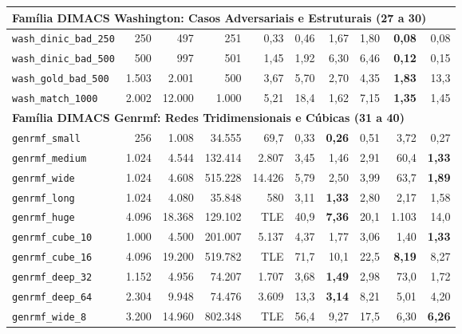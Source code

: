\begin{longtable}{lrrrrrrrrr}
\midrule
\multicolumn{10}{l}{\textbf{Família DIMACS Washington: Casos Adversariais e Estruturais (27 a 30)}} \\
\midrule
\texttt{wash\_dinic\_bad\_250} & 250 & 497 & 251 & 0,33 & 0,46 & 1,67 & 1,80 & \textbf{0,08} & 0,08 \\
\texttt{wash\_dinic\_bad\_500} & 500 & 997 & 501 & 1,45 & 1,92 & 6,30 & 6,46 & \textbf{0,12} & 0,15 \\
\texttt{wash\_gold\_bad\_500} & 1.503 & 2.001 & 500 & 3,67 & 5,70 & 2,70 & 4,35 & \textbf{1,83} & 13,3 \\
\texttt{wash\_match\_1000} & 2.002 & 12.000 & 1.000 & 5,21 & 18,4 & 1,62 & 7,15 & \textbf{1,35} & 1,45 \\
\midrule
\multicolumn{10}{l}{\textbf{Família DIMACS Genrmf: Redes Tridimensionais e Cúbicas (31 a 40)}} \\
\midrule
\texttt{genrmf\_small} & 256 & 1.008 & 34.555 & 69,7 & 0,33 & \textbf{0,26} & 0,51 & 3,72 & 0,27 \\
\texttt{genrmf\_medium} & 1.024 & 4.544 & 132.414 & 2.807 & 3,45 & 1,46 & 2,91 & 60,4 & \textbf{1,33} \\
\texttt{genrmf\_wide} & 1.024 & 4.608 & 515.228 & 14.426 & 5,79 & 2,50 & 3,99 & 63,7 & \textbf{1,89} \\
\texttt{genrmf\_long} & 1.024 & 4.080 & 35.848 & 580 & 3,11 & \textbf{1,33} & 2,80 & 2,17 & 1,58 \\
\texttt{genrmf\_huge} & 4.096 & 18.368 & 129.102 & TLE & 40,9 & \textbf{7,36} & 20,1 & 1.103 & 14,0 \\
\texttt{genrmf\_cube\_10} & 1.000 & 4.500 & 201.007 & 5.137 & 4,37 & 1,77 & 3,06 & 1,40 & \textbf{1,33} \\
\texttt{genrmf\_cube\_16} & 4.096 & 19.200 & 519.782 & TLE & 71,7 & 10,1 & 22,5 & \textbf{8,19} & 8,27 \\
\texttt{genrmf\_deep\_32} & 1.152 & 4.956 & 74.207 & 1.707 & 3,68 & \textbf{1,49} & 2,98 & 73,0 & 1,72 \\
\texttt{genrmf\_deep\_64} & 2.304 & 9.948 & 74.476 & 3.609 & 13,3 & \textbf{3,14} & 8,21 & 5,01 & 4,20 \\
\texttt{genrmf\_wide\_8} & 3.200 & 14.960 & 802.348 & TLE & 56,4 & 9,27 & 17,5 & 6,30 & \textbf{6,26} \\
\bottomrule
\end{longtable}
\endgroup
